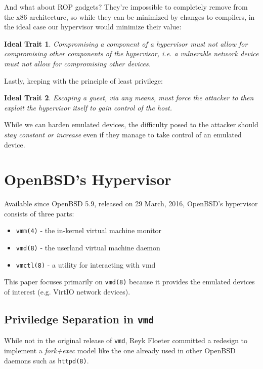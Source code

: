 \documentclass[conference]{IEEEtran}
\newtheorem{trait}{Ideal Trait}
\begin{document}
And what about ROP gadgets? They're impossible to completely remove
from the x86 architecture, so while they can be minimized by changes
to compilers, in the ideal case our hypervisor would minimize their
value:

\begin{trait} \label{trait2}
  Compromising a component of a hypervisor must not allow for
  compromising other components of the hypervisor, i.e. a vulnerable
  network device must not allow for compromising other devices.
\end{trait}

Lastly, keeping with the principle of least privilege:

\begin{trait} \label{trait3}
  Escaping a guest, via any means, must force the attacker to then
  exploit the hypervisor itself to gain control of the host.
\end{trait}

While we can harden emulated devices, the difficulty posed to the
attacker should \emph{stay constant or increase} even if they manage
to take control of an emulated device.


\section{OpenBSD's Hypervisor}
Available since OpenBSD 5.9, released on 29 March, 2016, OpenBSD's
hypervisor consists of three parts:

\begin{itemize}
\item \texttt{vmm(4)} - the in-kernel virtual machine monitor
\item \texttt{vmd(8)} - the userland virtual machine daemon
\item \texttt{vmctl(8)} - a utility for interacting with vmd
\end{itemize}

This paper focuses primarily on \texttt{vmd(8)} because it provides
the emulated devices of interest (e.g. VirtIO network devices).

\subsection{Priviledge Separation in \texttt{vmd}}
While not in the original release of \texttt{vmd}, Reyk Floeter
committed \cite{b6} a redesign to implement a \emph{fork+exec} model
like the one already used in other OpenBSD daemons such as
\texttt{httpd(8)}.
\end{document}

